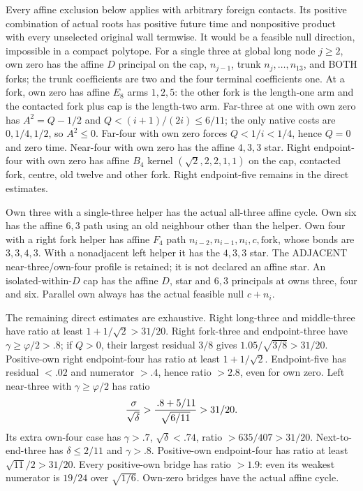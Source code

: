 Every affine exclusion below applies with arbitrary foreign
contacts.  Its positive combination of actual roots has
positive future time and nonpositive product with every
unselected original wall termwise.
It would be a feasible null direction, impossible in a
compact polytope.
For a single three at global long node \(j\ge2\), own zero
has the affine \(D\) principal on the cap, \(n_{j-1}\),
trunk \(n_j,\ldots,n_{13}\), and BOTH forks;
the trunk coefficients are two and the four terminal
coefficients one.
At a fork, own zero has affine \(E_8\) arms \(1,2,5\):
the other fork is the length-one arm and the contacted fork
plus cap is the length-two arm.
Far-three at one with own zero has
\(A^2=Q-1/2\) and \(Q<(i+1)/(2i)\le6/11\);
the only native costs are \(0,1/4,1/2\), so \(A^2\le0\).
Far-four with own zero forces \(Q<1/i<1/4\),
hence \(Q=0\) and zero time.
Near-four with own zero has the affine \(4,3,3\) star.
Right endpoint-four with own zero has affine \(B_4\)
kernel \((\sqrt2,2,2,1,1)\) on the cap, contacted fork,
centre, old twelve and other fork.
Right endpoint-five remains in the direct estimates.

Own three with a single-three helper has the actual
all-three affine cycle.
Own six has the affine \(6,3\) path using an old neighbour
other than the helper.
Own four with a right fork helper has affine \(F_4\)
path \(n_{i-2},n_{i-1},n_i,c,\text{fork}\),
whose bonds are \(3,3,4,3\).
With a nonadjacent left helper it has the \(4,3,3\) star.
The ADJACENT near-three/own-four profile is retained;
it is not declared an affine star.
An isolated-within-\(D\) cap has the affine \(D\),
star and \(6,3\) principals at owns three, four and six.
Parallel own always has the actual feasible null \(c+n_i\).

The remaining direct estimates are exhaustive.
Right long-three and middle-three have ratio at least
\(1+1/\sqrt2>31/20\).
Right fork-three and endpoint-three have
\(\gamma\ge\varphi/2>.8\); if \(Q>0\), their largest
residual \(3/8\) gives
\(1.05/\sqrt{3/8}>31/20\).
Positive-own right endpoint-four has ratio at least
\(1+1/\sqrt2\).
Endpoint-five has residual \(<.02\) and numerator \(>.4\),
hence ratio \(>2.8\), even for own zero.
Left near-three with \(\gamma\ge\varphi/2\) has ratio
\[
 {\,\sigma\over\sqrt\delta}>
 {\, .8+5/11\over\sqrt{6/11}}>31/20 .
\]
Its extra own-four case has \(\gamma>.7\),
\(\sqrt\delta<.74\), ratio \(>635/407>31/20\).
Next-to-end-three has \(\delta\le2/11\) and \(\gamma>.8\).
Positive-own endpoint-four has ratio at least
\(\sqrt{11}/2>31/20\).
Every positive-own bridge has ratio \(>1.9\):
even its weakest numerator is \(19/24\) over \(\sqrt{1/6}\).
Own-zero bridges have the actual affine cycle.

